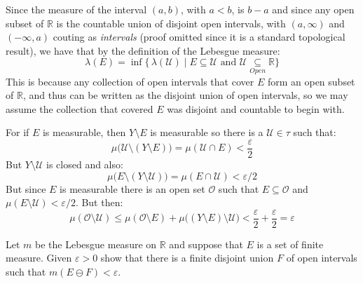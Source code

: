 \documentclass[crop=false,class=article]{standalone}                           %
\begin{document}
        \begin{solution}
            Since the measure of the interval $(a,b)$, with $a<b$, is $b-a$ and
            since any open subset of $\mathbb{R}$ is the countable union of
            disjoint open intervals, with $(a,\infty)$ and $(\minus\infty,a)$
            couting as \textit{intervals} (proof omitted since it is a
            standard topological result), we have that by the definition of the
            Lebesgue measure:
            \begin{equation}
                \lambda(E)=
                \inf\big\{\,\lambda(\mathcal{U})\;|\;E\subseteq\mathcal{U}
                    \textrm{ and }\mathcal{U}\underset{Open}{\subseteq}
                    \mathbb{R}\big\}
            \end{equation}
            This is because any collection of open intervals that cover $E$
            form an open subset of $\mathbb{R}$, and thus can be written as the
            disjoint union of open intervals, so we may assume the collection
            that covered $E$ was disjoint and countable to begin with.
            \par\hfill\par
            For if $E$ is measurable, then $Y\setminus{E}$ is measurable so
            there is a $\mathcal{U}\in\tau$ such that:
            \begin{equation}
                \mu\big(\mathcal{U}\setminus(Y\setminus{E})\big)
                =\mu(\mathcal{U}\cap{E})<\frac{\varepsilon}{2}
            \end{equation}
            But ${Y}\setminus\mathcal{U}$ is closed and also:
            \begin{equation}
                \mu\big(E\setminus(Y\setminus\mathcal{U})\big)
                =\mu(E\cap\mathcal{U})<\varepsilon/2
            \end{equation}
            But since $E$ is measurable there is an open set $\mathcal{O}$ such
            that $E\subseteq\mathcal{O}$ and
            $\mu(E\setminus\mathcal{U})<\varepsilon/2$. But then:
            \begin{equation}
                \mu(\mathcal{O}\setminus\mathcal{U})
                \leq\mu(\mathcal{O}\setminus{E})
                +\mu\big((Y\setminus{E})\setminus\mathcal{U}\big)
                <\frac{\varepsilon}{2}+\frac{\varepsilon}{2}
                =\varepsilon
            \end{equation}
        \end{solution}
        \begin{problem}
            Let $m$ be the Lebesgue measure on $\mathbb{R}$ and suppose that $E$
            is a set of finite measure. Given $\varepsilon>0$ show that there is
            a finite disjoint union $F$ of open intervals such that
            $m(E\ominus{F})<\varepsilon$.
        \end{problem}
\end{document}
